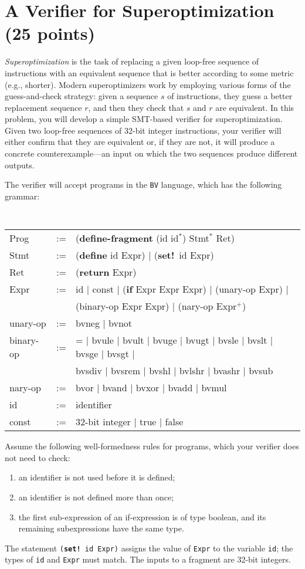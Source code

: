 \documentclass{handout}
\begin{document}
\section{A Verifier for Superoptimization (25 points)}

\emph{Superoptimization} is the task of replacing a given loop-free sequence of
instructions with an equivalent sequence that is better according to some metric
(e.g., shorter).  Modern superoptimizers work by employing various forms of the
guess-and-check strategy:  given a sequence $s$ of instructions, they guess a
better replacement sequence $r$, and then they check that $s$ and $r$ are
equivalent.  In this problem, you will develop a simple SMT-based verifier for
superoptimization.  Given two loop-free sequences of 32-bit integer
instructions, your verifier will either confirm that they are equivalent or, if
they are not, it will produce a concrete counterexample---an input on which the
two sequences produce different outputs.

The verifier will accept programs in the \texttt{BV} language, which has the
following grammar:

{\tt\small
\begin{tabular}{lcl}
Prog &:=&  (\textbf{define-fragment} (id id$^\mathtt{*}$) Stmt$^\mathtt{*}$ Ret) \\
Stmt &:=& (\textbf{define} id Expr) $|$ (\textbf{set!}\ id Expr) \\
Ret &:=& (\textbf{return} Expr) \\
Expr &:=& id $|$ const $|$ (\textbf{if} Expr Expr Expr) $|$ (unary-op Expr) $|$ \\
         &&(binary-op Expr Expr) $|$ (nary-op Expr$^\mathtt{+}$)\\
unary-op &:=& bvneg $|$ bvnot \\
binary-op &:=& = $|$ bvule $|$ bvult $|$ bvuge $|$ bvugt $|$ bvsle $|$ bvslt  $|$ bvsge $|$ bvsgt $|$  \\
                && bvsdiv $|$ bvsrem $|$ bvshl $|$ bvlshr $|$ bvashr $|$ bvsub\\
nary-op &:=& bvor $|$ bvand $|$ bvxor $|$  bvadd $|$  bvmul\\
id &:=& identifier\\
const &:=& 32-bit integer $|$ true $|$ false\\
\end{tabular}}

Assume the following well-formedness rules for programs, which your verifier
does not need to check:
\begin{enumerate}
\item an identifier is not used before it is defined;
\item an identifier is not defined more than once;
\item the first sub-expression of an if-expression is of type boolean, and its remaining subexpressions have the same type.
\end{enumerate}
The statement \texttt{(\textbf{set!}\ id Expr)}  assigns the value of
\texttt{Expr} to the variable \texttt{id}; the types of \texttt{id} and
\texttt{Expr} must match.  The inputs to a fragment are 32-bit integers.
\end{document}
